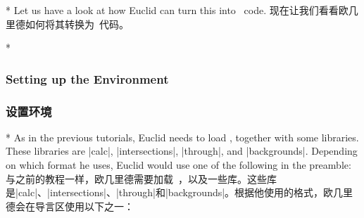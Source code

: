\begin{paracol}{2}

\switchcolumn[0]*%
Let us have a look at how Euclid can turn this into \tikzname\ code.
\switchcolumn
现在让我们看看欧几里德如何将其转换为\tikzname\ 代码。

\switchcolumn[0]*%
\subsubsection{Setting up the Environment}
\switchcolumn
\subsubsection{设置环境}
\switchcolumn[0]*%
As in the previous tutorials, Euclid needs to load \tikzname, together with
some libraries. These libraries are |calc|, |intersections|, |through|, and
|backgrounds|. Depending on which format he uses, Euclid would use one of the
following in the preamble:
\switchcolumn
与之前的教程一样，欧几里德需要加载\tikzname\ ，以及一些库。这些库是|calc|、|intersections|、|through|和|backgrounds|。根据他使用的格式，欧几里德会在导言区使用以下之一：
\switchcolumn[1]\begin{codeexample}
\usepackage{tikz}
\usetikzlibrary{calc,intersections,through,backgrounds}
\end{codeexample}

\switchcolumn[1]\begin{codeexample}

\usetikzlibrary{calc,intersections,through,backgrounds}
\end{codeexample}


\end{paracol}
